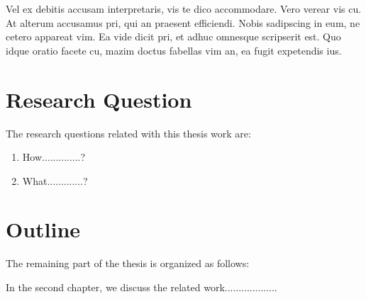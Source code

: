 Vel ex debitis accusam interpretaris, vis te dico accommodare. Vero verear vis cu. At alterum accusamus pri, qui an praesent efficiendi. Nobis sadipscing in eum, ne cetero appareat vim. Ea vide dicit pri, et adhuc omnesque scripserit est. Quo idque oratio facete cu, mazim doctus fabellas vim an, ea fugit expetendis ius.


\section{Research Question}
The research questions related with this thesis work are: 

\begin{enumerate}
	
\item How..............?

\item What.............?

\end{enumerate}

\section{Outline}
The remaining part of the thesis is organized as follows:

In the second chapter, we discuss the related work...................

